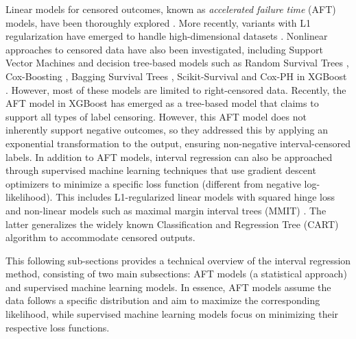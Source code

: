 \documentclass[12pt]{article}
\begin{document}
Linear models for censored outcomes, known as \textit{accelerated failure time} (AFT) models, have been thoroughly explored \citep{aft}. 
More recently, variants with L1 regularization have emerged to handle high-dimensional datasets \citep{aft_cai2009regularized, aft_huang2006regularized}. 
Nonlinear approaches to censored data have also been investigated, including Support Vector Machines \citep{svm} and decision tree-based models such as Random Survival Trees \citep{ishwaran2008random}, Cox-Boosting \citep{binder2008allowing}, Bagging Survival Trees \citep{hothorn2004bagging}, Scikit-Survival \citep{polsterl2020scikit} and Cox-PH in XGBoost \citep{lundberg2018consistent}.
However, most of these models are limited to right-censored data.
Recently, the AFT model in XGBoost \citep{aft_xgboost} has emerged as a tree-based model that claims to support all types of label censoring.
However, this AFT model does not inherently support negative outcomes, so they addressed this by applying an exponential transformation to the output, ensuring non-negative interval-censored labels.
In addition to AFT models, interval regression can also be approached through supervised machine learning techniques that use gradient descent optimizers to minimize a specific loss function (different from negative log-likelihood). This includes L1-regularized linear models with squared hinge loss \citep{rigaill:13} and non-linear models such as maximal margin interval trees (MMIT) \citep{mmit}. The latter generalizes the widely known Classification and Regression Tree (CART) algorithm \citep{cart} to accommodate censored outputs.

This following sub-sections provides a technical overview of the interval regression method, consisting of two main subsections: AFT models (a statistical approach) and supervised machine learning models. 
In essence, AFT models assume the data follows a specific distribution and aim to maximize the corresponding likelihood, while supervised machine learning models focus on minimizing their respective loss functions.
\end{document}
